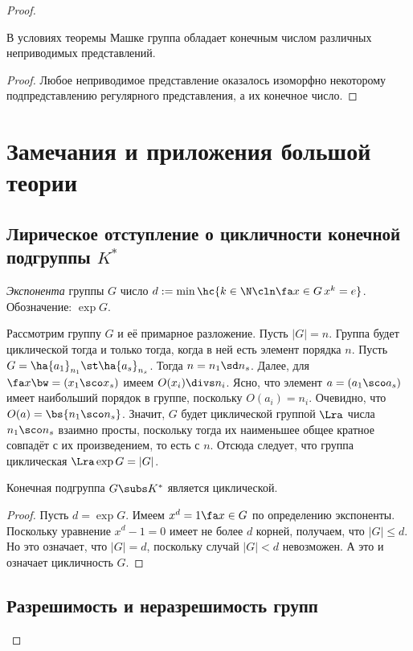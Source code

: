 \documentclass[a4paper]{article}
\begin{document}
\begin{proof}
\begin{imp}
В условиях теоремы Машке группа обладает конечным числом различных неприводимых представлений.
\end{imp}
\begin{proof}
Любое неприводимое представление оказалось изоморфно некоторому  подпредставлению регулярного представления,
а их конечное число.
\end{proof}

\section{Замечания и приложения большой теории}

\subsection{Лирическое отступление о цикличности конечной подгруппы $K^*$}

\begin{df}
\emph{Экспонента} группы $G$ число $d := \min \hc{k \in \N\cln \fa x \in G\, x^k = e}$. Обозначение: $\exp G$.
\end{df}

Рассмотрим группу $G$ и её примарное разложение. Пусть $|G| = n$. Группа будет циклической тогда и только
тогда, когда в ней есть элемент порядка $n$. Пусть $G = \ha{a_1}_{n_1}\st \ha{a_s}_{n_s}$. Тогда $n = n_1\sd
n_s$. Далее, для $\fa x \bw= (x_1\sco x_s)$ имеем $O(x_i) \divs n_i$. Ясно, что элемент $a = (a_1\sco a_s)$ имеет
наибольший порядок в группе, поскольку $O(a_i) = n_i$. Очевидно, что $O(a) = \bs{n_1\sco n_s}$. Значит, $G$
будет циклической группой $\Lra$ числа $n_1\sco n_s$ взаимно просты, поскольку тогда их наименьшее общее
кратное совпадёт с их произведением, то есть с $n$. Отсюда следует, что группа циклическая $\Lra \exp G = |G|$.

\begin{theorem}
Конечная подгруппа $G \subs K^*$ является циклической.
\end{theorem}
\begin{proof}
Пусть $d = \exp G$. Имеем $x^d = 1 \fa x \in G$ по определению экспоненты.  Поскольку уравнение $x^d-1=0$
имеет не более $d$ корней, получаем, что $|G| \le d$. Но это означает, что $|G| = d$, поскольку случай $|G| <
d$ невозможен. А это и означает цикличность $G$.
\end{proof}

\subsection{Разрешимость и неразрешимость групп}


\end{proof}
\end{document}
